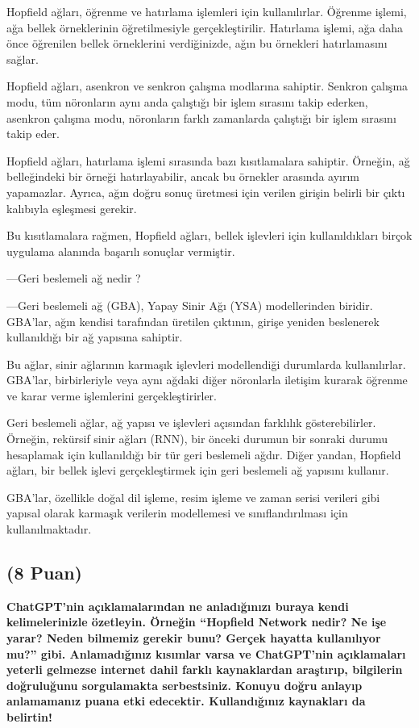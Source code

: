\documentclass[11pt]{article}
\begin{document}
Hopfield ağları, öğrenme ve hatırlama işlemleri için kullanılırlar. Öğrenme işlemi, ağa bellek örneklerinin öğretilmesiyle gerçekleştirilir. Hatırlama işlemi, ağa daha önce öğrenilen bellek örneklerini verdiğinizde, ağın bu örnekleri hatırlamasını sağlar.

Hopfield ağları, asenkron ve senkron çalışma modlarına sahiptir. Senkron çalışma modu, tüm nöronların aynı anda çalıştığı bir işlem sırasını takip ederken, asenkron çalışma modu, nöronların farklı zamanlarda çalıştığı bir işlem sırasını takip eder.

Hopfield ağları, hatırlama işlemi sırasında bazı kısıtlamalara sahiptir. Örneğin, ağ belleğindeki bir örneği hatırlayabilir, ancak bu örnekler arasında ayırım yapamazlar. Ayrıca, ağın doğru sonuç üretmesi için verilen girişin belirli bir çıktı kalıbıyla eşleşmesi gerekir.

Bu kısıtlamalara rağmen, Hopfield ağları, bellek işlevleri için kullanıldıkları birçok uygulama alanında başarılı sonuçlar vermiştir.

---Geri beslemeli ağ nedir ?

---Geri beslemeli ağ (GBA), Yapay Sinir Ağı (YSA) modellerinden biridir. GBA'lar, ağın kendisi tarafından üretilen çıktının, girişe yeniden beslenerek kullanıldığı bir ağ yapısına sahiptir.

Bu ağlar, sinir ağlarının karmaşık işlevleri modellendiği durumlarda kullanılırlar. GBA'lar, birbirleriyle veya aynı ağdaki diğer nöronlarla iletişim kurarak öğrenme ve karar verme işlemlerini gerçekleştirirler.

Geri beslemeli ağlar, ağ yapısı ve işlevleri açısından farklılık gösterebilirler. Örneğin, rekürsif sinir ağları (RNN), bir önceki durumun bir sonraki durumu hesaplamak için kullanıldığı bir tür geri beslemeli ağdır. Diğer yandan, Hopfield ağları, bir bellek işlevi gerçekleştirmek için geri beslemeli ağ yapısını kullanır.

GBA'lar, özellikle doğal dil işleme, resim işleme ve zaman serisi verileri gibi yapısal olarak karmaşık verilerin modellemesi ve sınıflandırılması için kullanılmaktadır.

\newpage
\subsection{(8 Puan)} \textbf{ChatGPT’nin açıklamalarından ne anladığınızı buraya kendi kelimelerinizle özetleyin. Örneğin ``Hopfield Network nedir? Ne işe yarar? Neden bilmemiz gerekir bunu? Gerçek hayatta kullanılıyor mu?'' gibi. Anlamadığınız kısımlar varsa ve ChatGPT’nin açıklamaları yeterli gelmezse internet dahil farklı kaynaklardan araştırıp, bilgilerin doğruluğunu sorgulamakta serbestsiniz. Konuyu doğru anlayıp anlamamanız puana etki edecektir. Kullandığınız kaynakları da belirtin!}
\end{document}
